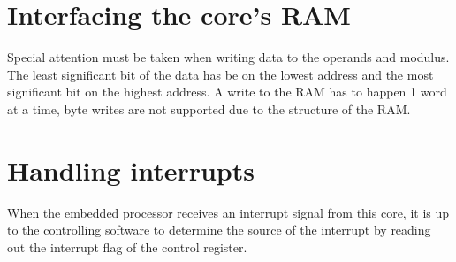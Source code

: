 \newline
\newline
{}
\newpage
\section{Interfacing the core's RAM}
Special attention must be taken when writing data to the operands and modulus. The least significant bit of the data has be on the lowest
address and the most significant bit on the highest address. A write to the RAM has to happen 1 word at a time, byte writes are not
supported due to the structure of the RAM.

\section{Handling interrupts}
When the embedded processor receives an interrupt signal from this core, it is up to the controlling software to
determine the source of the interrupt by reading out the interrupt flag of the control register.